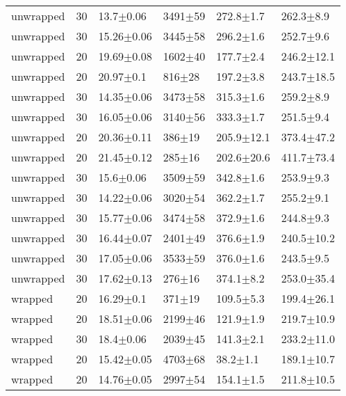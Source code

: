 \begin{tabular}{lrllll}
    unwrapped &      30 &    13.7$\pm$0.06 &  3491$\pm$59 &   272.8$\pm$1.7 &   262.3$\pm$8.9 \\
    unwrapped &      30 &   15.26$\pm$0.06 &  3445$\pm$58 &   296.2$\pm$1.6 &   252.7$\pm$9.6 \\
    unwrapped &      20 &   19.69$\pm$0.08 &  1602$\pm$40 &   177.7$\pm$2.4 &  246.2$\pm$12.1 \\
    unwrapped &      20 &    20.97$\pm$0.1 &   816$\pm$28 &   197.2$\pm$3.8 &  243.7$\pm$18.5 \\
    unwrapped &      30 &   14.35$\pm$0.06 &  3473$\pm$58 &   315.3$\pm$1.6 &   259.2$\pm$8.9 \\
    unwrapped &      30 &   16.05$\pm$0.06 &  3140$\pm$56 &   333.3$\pm$1.7 &   251.5$\pm$9.4 \\
    unwrapped &      20 &   20.36$\pm$0.11 &   386$\pm$19 &  205.9$\pm$12.1 &  373.4$\pm$47.2 \\
    unwrapped &      20 &   21.45$\pm$0.12 &   285$\pm$16 &  202.6$\pm$20.6 &  411.7$\pm$73.4 \\
    unwrapped &      30 &    15.6$\pm$0.06 &  3509$\pm$59 &   342.8$\pm$1.6 &   253.9$\pm$9.3 \\
    unwrapped &      30 &   14.22$\pm$0.06 &  3020$\pm$54 &   362.2$\pm$1.7 &   255.2$\pm$9.1 \\
    unwrapped &      30 &   15.77$\pm$0.06 &  3474$\pm$58 &   372.9$\pm$1.6 &   244.8$\pm$9.3 \\
    unwrapped &      30 &   16.44$\pm$0.07 &  2401$\pm$49 &   376.6$\pm$1.9 &  240.5$\pm$10.2 \\
    unwrapped &      30 &   17.05$\pm$0.06 &  3533$\pm$59 &   376.0$\pm$1.6 &   243.5$\pm$9.5 \\
    unwrapped &      30 &   17.62$\pm$0.13 &   276$\pm$16 &   374.1$\pm$8.2 &  253.0$\pm$35.4 \\
      wrapped &      20 &    16.29$\pm$0.1 &   371$\pm$19 &   109.5$\pm$5.3 &  199.4$\pm$26.1 \\
      wrapped &      20 &   18.51$\pm$0.06 &  2199$\pm$46 &   121.9$\pm$1.9 &  219.7$\pm$10.9 \\
      wrapped &      30 &    18.4$\pm$0.06 &  2039$\pm$45 &   141.3$\pm$2.1 &  233.2$\pm$11.0 \\
      wrapped &      20 &   15.42$\pm$0.05 &  4703$\pm$68 &    38.2$\pm$1.1 &  189.1$\pm$10.7 \\
      wrapped &      20 &   14.76$\pm$0.05 &  2997$\pm$54 &   154.1$\pm$1.5 &  211.8$\pm$10.5 \\

\end{tabular}
